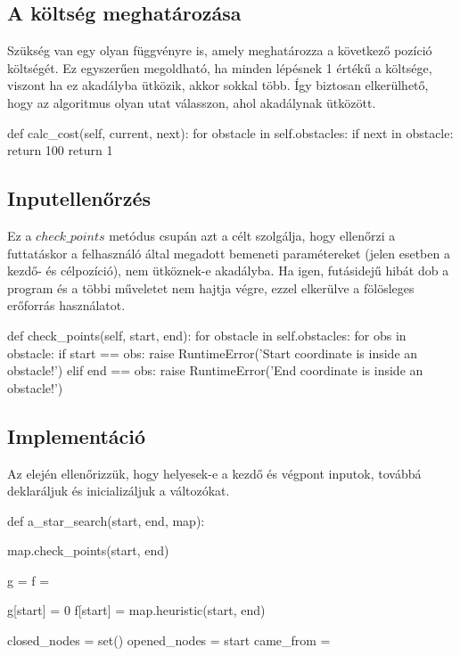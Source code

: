 \subsection{A költség meghatározása}

Szükség van egy olyan függvényre is, amely meghatározza a következő pozíció költségét. Ez egyszerűen megoldható, ha minden lépésnek 1 értékű a költsége, viszont ha ez akadályba ütközik, akkor sokkal több. Így biztosan elkerülhető, hogy az algoritmus olyan utat válasszon, ahol akadálynak ütközött.
\begin{python}
    def calc_cost(self, current, next):
        for obstacle in self.obstacles:
            if next in obstacle:
                return 100
        return 1
\end{python}

\subsection{Inputellenőrzés}
Ez a $ check\_points $ metódus csupán azt a célt szolgálja, hogy ellenőrzi a futtatáskor a felhasználó által megadott bemeneti paramétereket (jelen esetben a kezdő- és célpozíció), nem ütköznek-e akadályba. Ha igen, futásidejű hibát dob a program és a többi műveletet nem hajtja végre, ezzel elkerülve a fölösleges erőforrás használatot.
\begin{python}
	def check_points(self, start, end):
        for obstacle in self.obstacles:
            for obs in obstacle:
                if start == obs:
                    raise RuntimeError('Start coordinate is inside 
                    an obstacle!')
                elif end == obs:
                    raise RuntimeError('End coordinate is inside
                    an obstacle!')
\end{python}

\subsection{Implementáció}

Az elején ellenőrizzük, hogy helyesek-e a kezdő és végpont inputok, továbbá deklaráljuk és inicializáljuk a változókat.
\begin{python}
def a_star_search(start, end, map):

    map.check_points(start, end)

    g = {}  
    f = {}  

    g[start] = 0
    f[start] = map.heuristic(start, end)

    closed_nodes = set()
    opened_nodes = {start}
    came_from = {}
\end{python}


